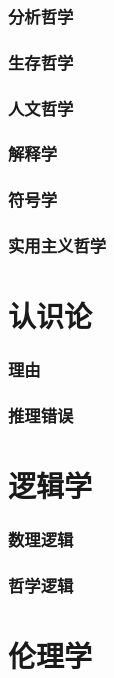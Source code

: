 \documentclass[UTF8]{../RepresentationUniverse}
\begin{document}
    \subsection{分析哲学}
    \subsection{生存哲学}
    \subsection{人文哲学}
    \subsection{解释学}
    \subsection{符号学}
    \subsection{实用主义哲学}
    




\chapter{认识论}
    \subsection{理由}
    \subsection{推理错误}

\chapter{逻辑学}
    \subsection{数理逻辑}
    \subsection{哲学逻辑}       

\chapter{伦理学}
\end{document}
